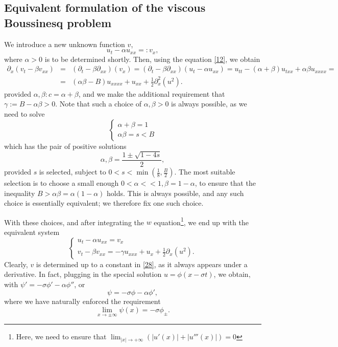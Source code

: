 \documentclass[12pt]{amsart}
\theoremstyle{definition}
\theoremstyle{remark}
\numberwithin{equation}{section}
\renewcommand{\(}{\left(}
\renewcommand{\)}{\right)}
\renewcommand{\[}{\left[}
\renewcommand{\]}{\right]}
\newcommand{\f}[2]{\frac{#1}{#2}}
\newcommand{\al}{\alpha}
\newcommand{\be}{\beta}
\newcommand{\ga}{\gamma}
\newcommand{\si}{\sigma}
\newcommand{\p}{\partial}
\begin{document}
 \subsection{Equivalent formulation of the viscous Boussinesq problem}  
We introduce a new unknown function $v$, 
$$
u_t-\al u_{xx}=:v_x,
$$
where $\al>0$ is to be determined shortly. Then, using the equation \eqref{12}, we obtain 
\begin{eqnarray*}
	\p_x (v_t - \be v_{xx}) &=& (\p_t-\be \p_{xx})(v_x) = (\p_t-\be \p_{xx})(u_t - \al u_{xx})=u_{tt}-(\al+\be) u_{txx} + \al \be u_{xxxx}=\\
	&=& (\al \be-B)u_{xxxx}+ u_{xx}+ \f{1}{2} \p_x^2(u^2).
\end{eqnarray*}
provided $\al, \be: c=\al+\be$, and we make the additional requirement that 
$\ga:=B-\al\be>0$. Note that such a choice of $\al, \be>0$  is always possible, as we need to solve 
$$
\begin{cases}
	\al+\be=1 \\
	\al \be = s<B
\end{cases}
$$
which has the pair of positive solutions 
$$
\al, \be=\f{1\pm \sqrt{1-4s}}{2},
$$
provided $s$ is selected, subject to  $0<s<\min(\f{1}{8}, \f{B}{2})$. The most suitable selection is to choose a small enough $0<\al<<1, \be=1-\al$, to ensure that the inequality $B>\al \be=\al(1-\al)$ holds. This is always possible, and any such choice is essentially equivalent; we therefore fix one such choice. 

With these choices, and after integrating the $w$ equation\footnote{Here, we need to ensure that $\lim_{|x|\to +\infty} (|u'(x)|+ |u'''(x)|)=0$}, we end up with the equivalent system 
\begin{equation}
	\label{28} 
	\begin{cases}
		u_t - \al u_{xx}= v_x \\
		v_t-\be  v_{xx}  = -\ga  u_{xxx}  + u_x + \f{1}{2} \p_x (u^2). 
	\end{cases}
\end{equation} 
Clearly, $v$ is determined up to a constant in \eqref{28}, as it always appears under a derivative. In fact, plugging in the special solution $u=\phi(x- \si t)$, we obtain, with $\psi'=-\si \phi'-\al \phi''$, or 
\begin{equation}
	\label{26}
	\psi=-\si  \phi-\al\phi', 
\end{equation}
where we have naturally enforced the requirement 
\begin{equation}
	\label{38} 
	\lim_{x\to \pm \infty} \psi(x)=-\si \phi_\pm.
\end{equation}
\end{document}
